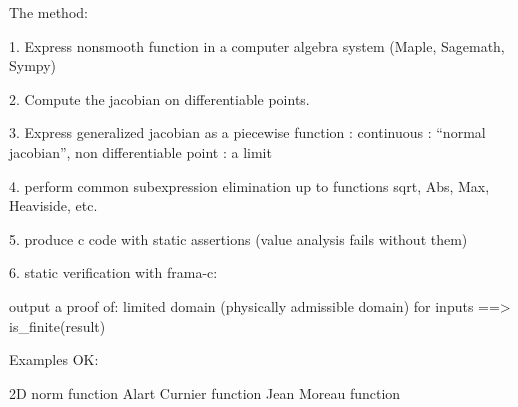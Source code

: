 \documentclass[a4paper]{article}
\begin{document}
\makeRT %

\newpage
\tableofcontents
\newpage

The method:

1. Express nonsmooth function in a computer algebra system (Maple, Sagemath, Sympy)

2. Compute the jacobian on differentiable points.

3. Express generalized jacobian as a piecewise function : continuous : ``normal jacobian'',  non differentiable point : a limit

4. perform common subexpression elimination up to functions sqrt, Abs, Max, Heaviside, etc.

5. produce c code with static assertions (value analysis fails without them)

6. static verification with frama-c:

output a proof of: limited domain (physically admissible domain) for inputs ==> is_finite(result)

Examples OK:

2D norm function
Alart Curnier function
Jean Moreau function
\end{document}
